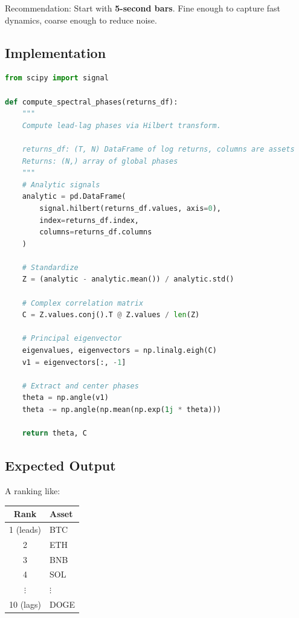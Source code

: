 \documentclass[11pt, a4paper]{article}
\begin{document}
Recommendation: Start with \textbf{5-second bars}. Fine enough to capture fast dynamics, coarse enough to reduce noise.

\subsection{Implementation}

\begin{lstlisting}[language=Python]
from scipy import signal

def compute_spectral_phases(returns_df):
    """
    Compute lead-lag phases via Hilbert transform.
    
    returns_df: (T, N) DataFrame of log returns, columns are assets
    Returns: (N,) array of global phases
    """
    # Analytic signals
    analytic = pd.DataFrame(
        signal.hilbert(returns_df.values, axis=0),
        index=returns_df.index,
        columns=returns_df.columns
    )
    
    # Standardize
    Z = (analytic - analytic.mean()) / analytic.std()
    
    # Complex correlation matrix
    C = Z.values.conj().T @ Z.values / len(Z)
    
    # Principal eigenvector
    eigenvalues, eigenvectors = np.linalg.eigh(C)
    v1 = eigenvectors[:, -1]
    
    # Extract and center phases
    theta = np.angle(v1)
    theta -= np.angle(np.mean(np.exp(1j * theta)))
    
    return theta, C
\end{lstlisting}

\subsection{Expected Output}

A ranking like:
\begin{center}
\begin{tabular}{cl}
\toprule
\textbf{Rank} & \textbf{Asset} \\
\midrule
1 (leads) & BTC \\
2 & ETH \\
3 & BNB \\
4 & SOL \\
$\vdots$ & $\vdots$ \\
10 (lags) & DOGE \\
\bottomrule
\end{tabular}
\end{center}
\end{document}
